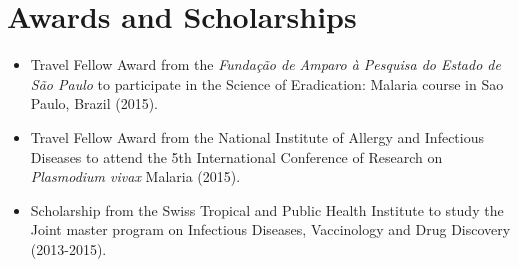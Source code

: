 \documentclass[11pt,a4paper,sans]{moderncv} %
\begin{document}
\section{Awards and Scholarships}
\begin{itemize}
  \item Travel Fellow Award from the \textit{Funda\c c\~ao de Amparo \`a Pesquisa do Estado de S\~ao Paulo} to participate in the Science of Eradication: Malaria course in Sao Paulo, Brazil (2015).
  \item Travel Fellow Award from the National Institute of Allergy and Infectious Diseases to attend the 5th International Conference of Research on \textit{Plasmodium vivax} Malaria (2015).
  \item Scholarship from the Swiss Tropical and Public Health Institute to study the Joint master program on Infectious Diseases, Vaccinology and Drug Discovery (2013-2015).\\
\end{itemize}
\end{document}
